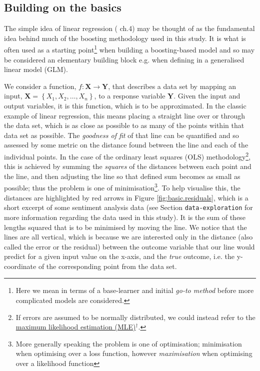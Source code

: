 \documentclass{article}
\begin{document}
\subsection{Building on the basics \label{linear-model}}
\label{sec-1-2}

The simple idea of linear regression (\cite{hyndman2014forecasting} ch.4) may be thought of as the fundamental idea behind much of the boosting methodology used in this study. It is what is often used as a starting point\footnote{Here we mean in terms of a base-learner and initial \emph{go-to method} before more complicated models are considered.} when building a boosting-based model and so may be considered an elementary building block e.g. when defining in a generalised linear model (GLM).

We consider a function, $f : \mathbf{X} \rightarrow \mathbf{Y}$, that describes a data set by mapping an input, $\mathbf{X} = \left\{ X_1, X_2, … , X_n \right\}$, to a response variable $\mathbf{Y}$. Given the input and output variables, it is this function, which is to be approximated. In the classic example of linear regression, this means placing a straight line over or through the data set, which is as close as possible to as many of the points within that data set as possible. The \emph{goodness of fit} of that line can be quantified and so assessed by some metric on the distance found between the line and each of the individual points. In the case of the ordinary least squares (OLS) methodology\footnote{If errors are assumed to be normally distributed, we could instead refer to the \href{https://en.wikipedia.org/wiki/Maximum_likelihood}{maximum likelihood estimation (MLE)$^{\dag{}}$}.}, this is achieved by summing the \emph{squares} of the distances between each point and the line, and then adjusting the line so that defined sum becomes as small as possible; thus the problem is one of minimisation\footnote{More generally speaking the problem is one of optimisation; minimisation when optimising over a loss function, however \emph{maximisation} when optimising over a likelihood function}. To help visualise this, the distances are highlighted by red arrows in Figure \ref{fig:basic.residuals}, which is a short excerpt of some sentiment analysis data (see Section \texttt{data-exploration} for more information regarding the data used in this study). It is the sum of these lengths squared that is to be minimised by moving the line. We notice that the lines are all vertical, which is because we are interested only in the distance (also called the error or the residual) between the outcome variable that our line would predict for a given input value on the x-axis, and the \emph{true} outcome, i.e. the y-coordinate of the corresponding point from the data set.
\end{document}
